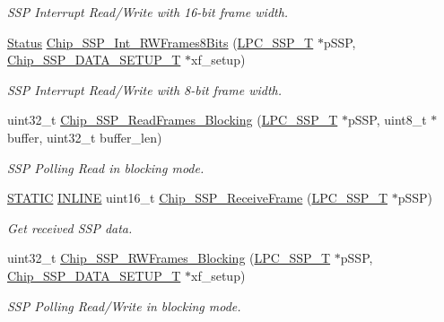 \begin{DoxyCompactItemize}
\begin{DoxyCompactList}\small\item\em S\+SP Interrupt Read/\+Write with 16-\/bit frame width. \end{DoxyCompactList}\item 
\hyperlink{group__LPC__Types__Public__Types_ga67a0db04d321a74b7e7fcfd3f1a3f70b}{Status} \hyperlink{group__SSP__17XX__40XX_ga23d901d1757b6d95efc20c4d76721fb3}{Chip\+\_\+\+S\+S\+P\+\_\+\+Int\+\_\+\+R\+W\+Frames8\+Bits} (\hyperlink{structLPC__SSP__T}{L\+P\+C\+\_\+\+S\+S\+P\+\_\+T} $\ast$p\+S\+SP, \hyperlink{structChip__SSP__DATA__SETUP__T}{Chip\+\_\+\+S\+S\+P\+\_\+\+D\+A\+T\+A\+\_\+\+S\+E\+T\+U\+P\+\_\+T} $\ast$xf\+\_\+setup)
\begin{DoxyCompactList}\small\item\em S\+SP Interrupt Read/\+Write with 8-\/bit frame width. \end{DoxyCompactList}\item 
uint32\+\_\+t \hyperlink{group__SSP__17XX__40XX_ga8332233bb63af754bd9cc369f2a1e2d6}{Chip\+\_\+\+S\+S\+P\+\_\+\+Read\+Frames\+\_\+\+Blocking} (\hyperlink{structLPC__SSP__T}{L\+P\+C\+\_\+\+S\+S\+P\+\_\+T} $\ast$p\+S\+SP, uint8\+\_\+t $\ast$buffer, uint32\+\_\+t buffer\+\_\+len)
\begin{DoxyCompactList}\small\item\em S\+SP Polling Read in blocking mode. \end{DoxyCompactList}\item 
\hyperlink{group__LPC__Types__Public__Macros_ga10b2d890d871e1489bb02b7e70d9bdfb}{S\+T\+A\+T\+IC} \hyperlink{group__LPC__Types__Public__Types_ga2eb6f9e0395b47b8d5e3eeae4fe0c116}{I\+N\+L\+I\+NE} uint16\+\_\+t \hyperlink{group__SSP__17XX__40XX_ga7da053acf90aff24ca59bdf673207aac}{Chip\+\_\+\+S\+S\+P\+\_\+\+Receive\+Frame} (\hyperlink{structLPC__SSP__T}{L\+P\+C\+\_\+\+S\+S\+P\+\_\+T} $\ast$p\+S\+SP)
\begin{DoxyCompactList}\small\item\em Get received S\+SP data. \end{DoxyCompactList}\item 
uint32\+\_\+t \hyperlink{group__SSP__17XX__40XX_ga302a381ad4d291164144ad2720399078}{Chip\+\_\+\+S\+S\+P\+\_\+\+R\+W\+Frames\+\_\+\+Blocking} (\hyperlink{structLPC__SSP__T}{L\+P\+C\+\_\+\+S\+S\+P\+\_\+T} $\ast$p\+S\+SP, \hyperlink{structChip__SSP__DATA__SETUP__T}{Chip\+\_\+\+S\+S\+P\+\_\+\+D\+A\+T\+A\+\_\+\+S\+E\+T\+U\+P\+\_\+T} $\ast$xf\+\_\+setup)
\begin{DoxyCompactList}\small\item\em S\+SP Polling Read/\+Write in blocking mode. \end{DoxyCompactList}\item 

\end{DoxyCompactItemize}
